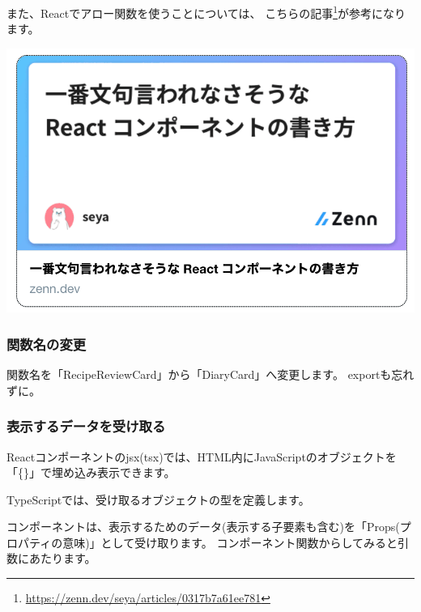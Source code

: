 また、Reactでアロー関数を使うことについては、
こちらの記事\footnote{\url{https://zenn.dev/seya/articles/0317b7a61ee781}}が参考になります。

\begin{reviewimage}%
\includegraphics[width=0.5\maxwidth]{./images/03-todo-with-react/sec00332-1-02.png}%
\label{image:03-todo-with-react:sec00332-1-02}
\end{reviewimage}

\subsubsection*{関数名の変更}
\keeplastskip{
  \label{sec:3-3-4-3}
  \label{sec-00332-3}
  \par\nobreak
}

関数名を「RecipeReviewCard」から「DiaryCard」へ変更します。
exportも忘れずに。

\subsubsection*{表示するデータを受け取る}
\keeplastskip{
  \label{sec:3-3-4-4}
  \label{sec-00332-4}
  \par\nobreak
}

Reactコンポーネントのjsx(tsx)では、HTML内にJavaScriptのオブジェクトを「\{\}」で埋め込み表示できます。

TypeScriptでは、受け取るオブジェクトの型を定義します。

\vspace*{\baselineskip}

コンポーネントは、表示するためのデータ(表示する子要素も含む)を「Props(プロパティの意味)」として受け取ります。
コンポーネント関数からしてみると引数にあたります。

